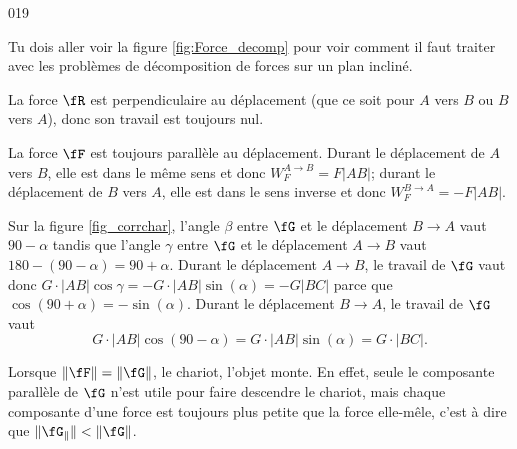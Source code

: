 \documentclass{article}
\begin{document}
\begin{corrige}{019}


Tu dois aller voir la figure \ref{fig:Force_decomp} pour voir comment il faut traiter avec les problèmes de décomposition de forces sur un plan incliné.

La force $\fR$ est perpendiculaire au déplacement (que ce soit pour $A$ vers $B$ ou $B$ vers $A$), donc son travail est toujours nul.

La force $\fF$ est toujours parallèle au déplacement. Durant le déplacement de $A$ vers $B$, elle est dans le même sens et donc $W_F^{A\to B}=F| AB |$; durant le déplacement de $B$ vers $A$, elle est dans le sens inverse et donc $W_F^{B\to A}=-F| AB |$.

Sur la figure \ref{fig_corrchar}, l'angle $\beta$ entre $\fG$ et le déplacement $B\to A$ vaut $90-\alpha$ tandis que l'angle $\gamma$ entre $\fG$ et le déplacement $A\to B$ vaut $180-(90-\alpha)=90+\alpha$.
Durant le déplacement $A\to B$, le travail de $\fG$ vaut donc $G\cdot| AB |\cos\gamma=-G\cdot| AB |\sin(\alpha)=-G| BC |$ parce que $\cos(90+\alpha)=-\sin(\alpha)$.
Durant le déplacement $B\to A$, le travail de $\fG$ vaut 
\[
G\cdot| AB |\cos(90-\alpha)=G\cdot| AB |\sin(\alpha)=G\cdot| BC |.
\]

Lorsque $\| \fF \|=\| \fG \|$, le chariot, l'objet monte. En effet, seule le composante parallèle de $\fG$ n'est utile pour faire descendre le chariot, mais chaque composante d'une force est toujours plus petite que la force elle-mêle, c'est à dire que $\| \fG_{\parallel} \|<\| \fG \|$.

\end{corrige}
\end{document}
